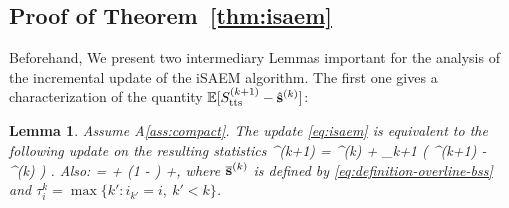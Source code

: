 \documentclass[journal, 11pt]{IEEEtran}
\newtheorem*{Lemma*}{Lemma}
\begin{document}
\vspace{0.2in}

\subsection{Proof of Theorem~\ref{thm:isaem}}\label{app:theoremisaem}
Beforehand, We present two intermediary Lemmas important for the analysis of the incremental update of the iSAEM algorithm.
The first one gives a characterization of the quantity $\mathbb{E}[S_{\textrm{tts}}^{(k+1)} - \hat{{\mathbf{s}}}^{(k)}]$:
\begin{Lemma*}
 Assume A\ref{ass:compact}. The update \eqref{eq:isaem} is equivalent to the following update on the resulting statistics 
\beq\notag
\hat{\bss}^{(k+1)} =  \hat{\bss}^{(k)}  + \gamma_{k+1} \big( \stt^{(k+1)} - \hat{\bss}^{(k)} \big) \eqsp.
\eeq 
Also:
\beq\notag
{} =  + \left(1 -  \right) \EE\left[\frac{1}{n} \sum_{i=1}^n \tilde{S}_i^{(\tau_i^k)}- \overline{\bss}^{(k)}\right]  +\EE[\eta_{i_k}^{(k+1)}]\eqsp ,
\eeq
where $\overline{{\mathbf{s}}}^{(k)}$ is defined by \eqref{eq:definition-overline-bss} and $\tau_i^k = \max \{ k' : i_{k'} = i,~k' < k \}$.
\end{Lemma*}
\end{document}
